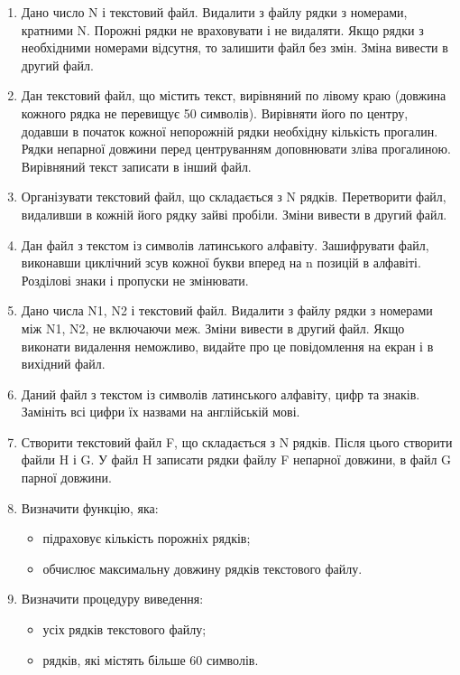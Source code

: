 \documentclass[a5paper,titlepage,openany,twoside,draft]{book_unv}%
\begin{document}
\begin{enumerate}
\def\labelenumi{\arabic{enumi})}
\setcounter{enumi}{12}
\item
  Дано число N і текстовий файл. Видалити з файлу рядки з номерами,
  кратними N. Порожні рядки не враховувати і не видаляти. Якщо рядки з
  необхідними номерами відсутня, то залишити файл без змін. Зміна
  вивести в другий файл.
\item
  Дан текстовий файл, що містить текст, вирівняний по лівому краю
  (довжина кожного рядка не перевищує 50 символів). Вирівняти його по
  центру, додавши в початок кожної непорожній рядки необхідну кількість
  прогалин. Рядки непарної довжини перед центруванням доповнювати зліва
  прогалиною. Вирівняний текст записати в інший файл.
\item
  Організувати текстовий файл, що складається з N рядків. Перетворити
  файл, видаливши в кожній його рядку зайві пробіли. Зміни вивести в
  другий файл.
\item
  Дан файл з текстом із символів латинського алфавіту. Зашифрувати файл,
  виконавши циклічний зсув кожної букви вперед на n позицій в алфавіті.
  Розділові знаки і пропуски не змінювати.
\item
  Дано числа N1, N2 і текстовий файл. Видалити з файлу рядки з номерами
  між N1, N2, не включаючи меж. Зміни вивести в другий файл. Якщо
  виконати видалення неможливо, видайте про це повідомлення на екран і в
  вихідний файл.
\item
  Даний файл з текстом із символів латинського алфавіту, цифр та знаків.
  Замініть всі цифри їх назвами на англійській мові.
\item
  Створити текстовий файл F, що складається з N рядків. Після цього
  створити файли H і G. У файл H записати рядки файлу F непарної
  довжини, в файл G парної довжини.

\item
 Визначити функцію, яка:
\begin{itemize}
\item підраховує кількість порожніх рядків;
\item обчислює максимальну довжину рядків текстового файлу.
\end{itemize}

\item Визначити процедуру виведення:
\begin{itemize}
\item усіх рядків текстового файлу;
\item рядків, які містять більше 60 символів.
\end{itemize}


\end{enumerate}
\end{document}
